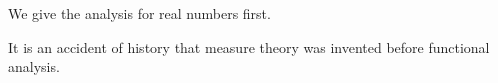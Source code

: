 
We give the analysis for real numbers first.

It is an accident of history that measure theory was invented before functional analysis.